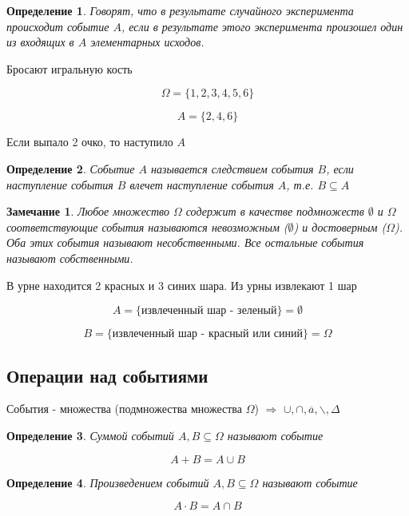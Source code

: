 \documentclass[a4paper, 14pt]{report}
\newtheorem{defenition}{Определение}[section]
\newtheorem{note}{Замечание}[section]
\begin{document}
\begin{defenition}
    Говорят, что в результате случайного эксперимента происходит событие $A$, если в результате этого эксперимента произошел один из входящих в $A$ элементарных исходов.
\end{defenition}

Бросают игральную кость

$$
\Omega = \{ 1,2,3,4,5,6 \}
$$

$$
A = \{2,4,6\}
$$

Если выпало 2 очко, то наступило $A$

\begin{defenition}
    Событие $A$ называется следствием события $B$, если наступление события $B$ влечет наступление события $A$, т.е. $B \subseteq A$
\end{defenition}

\begin{note}
    Любое множество $\Omega$ содержит в качестве подмножеств $\emptyset$ и $\Omega$ соответствующие события называются невозможным ($\emptyset$) и достоверным ($\Omega$). Оба этих события называют несобственными. Все остальные события называют собственными.
\end{note}

В урне находится 2 красных и 3 синих шара. Из урны извлекают 1 шар

$$
A = \{ \text{извлеченный шар - зеленый} \} = \emptyset
$$

$$
B = \{ \text{извлеченный шар - красный или синий} \} = \Omega
$$

\subsection{Операции над событиями}

События - множества (подмножества множества $\Omega$) $\Rightarrow$ $\cup, \cap, \overline{a}, \backslash, \Delta$ 

\begin{defenition}
    Суммой событий $A,B \subseteq \Omega$ называют событие

    $$
    A + B = A \cup B
    $$
\end{defenition}

\begin{defenition}
    Произведением событий $A,B \subseteq \Omega$ называют событие

    $$
    A \cdot B = A \cap B
    $$
\end{defenition}
\end{document}

